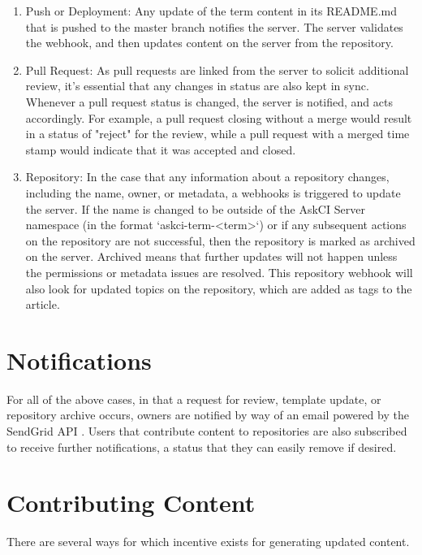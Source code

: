 \documentclass{jors}
\begin{document}
\begin{enumerate}
\item Push or Deployment: Any update of the term content in its README.md that is pushed to the master branch notifies the server. The server validates the webhook, and then updates content on the server from the repository. 

\item Pull Request: As pull requests are linked from the server to solicit additional review, it's essential that any changes in status are also kept in sync. Whenever a pull request status is changed, the server is notified, and acts accordingly. For example, a pull request closing without a merge would result in a status of "reject" for the review, while a pull request with a merged time stamp would indicate that it was accepted and closed.
\item Repository: In the case that any information about a repository changes, including the name, owner, or metadata, a webhooks is triggered to update the server. If the name is changed to be outside of the AskCI Server namespace (in the format `askci-term-<term>`) or if any subsequent actions on the repository are not successful, then the repository is marked as archived on the server. Archived means that further updates will not happen unless the permissions or metadata issues are resolved. This repository webhook will also look for updated topics \cite{github-topics} on the repository, which are added as tags to the article.
\end{enumerate}

\thispagestyle{empty} 
\section*{Notifications}

For all of the above cases, in that a request for review, template update, or repository archive occurs,
owners are notified by way of an email powered by the SendGrid API \cite{sendgrid}. Users that contribute
content to repositories are also subscribed to receive further notifications, a status that they can
easily remove if desired.

\section*{Contributing Content}

There are several ways for which incentive exists for generating updated content.
\end{document}
